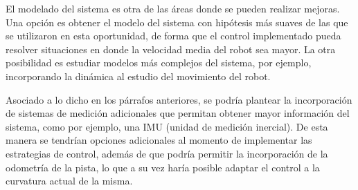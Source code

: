 \documentclass[10pt,conference,a4paper,onecolumn]{article}%
\begin{document}
El modelado del sistema es otra de las áreas donde se pueden realizar mejoras. Una opción es obtener el modelo del sistema con hipótesis más suaves de las que se utilizaron en esta oportunidad, de forma que el control implementado pueda resolver situaciones en donde la velocidad media del robot sea mayor. La otra posibilidad es estudiar modelos más complejos del sistema, por ejemplo, incorporando la dinámica al estudio del movimiento del robot.

Asociado a lo dicho en los párrafos anteriores, se podría plantear la incorporación de sistemas de medición adicionales que permitan obtener mayor información del sistema, como por ejemplo, una IMU (unidad de medición inercial). De esta manera se tendrían opciones adicionales al momento de implementar las estrategias de control, además de que podría permitir la incorporación de la odometría de la pista, lo que a su vez haría posible adaptar el control a la curvatura actual de la misma.
\end{document}
